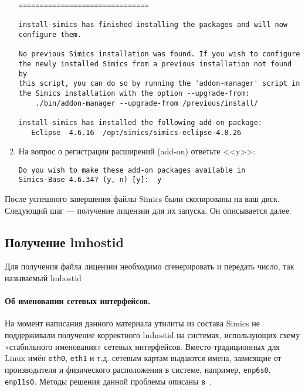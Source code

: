 \begin{enumerate}
\begin{lstlisting}
===============================

install-simics has finished installing the packages and will now
configure them.

No previous Simics installation was found. If you wish to configure
the newly installed Simics from a previous installation not found by
this script, you can do so by running the 'addon-manager' script in
the Simics installation with the option --upgrade-from:
    ./bin/addon-manager --upgrade-from /previous/install/

install-simics has installed the following add-on package:
   Eclipse  4.6.16  /opt/simics/simics-eclipse-4.8.26
\end{lstlisting}

\item На вопрос о регистрации расширений (\abbr add-on) ответьте <<y>>:
\begin{lstlisting}
Do you wish to make these add-on packages available in
Simics-Base 4.6.34? (y, n) [y]:  y
\end{lstlisting}   
\end{enumerate}

После успешного завершения файлы Simics были скопированы на ваш диск. Следующий шаг --- получение лицензии для их запуска. Он описывается далее.

\subsection{Получение lmhostid}

Для получения файла лицензии необходимо сгенерировать и передать число, так называемый lmhostid

\paragraph{Об именовании сетевых интерфейсов.} На момент написания данного материала утилиты из состава Simics не поддерживали получение корректного lmhostid на системах, использующих схему «стабильного именования» сетевых интерфейсов. Вместо традиционных для Linux имён \texttt{eth0}, \texttt{eth1} и т.д. сетевым картам выдаются имена, зависящие от производителя и физического расположения в системе, например, \texttt{enp6s0}, \texttt{enp11s0}. 
Методы решения данной проблемы описаны в~\cite{predictable-iface-names}.

